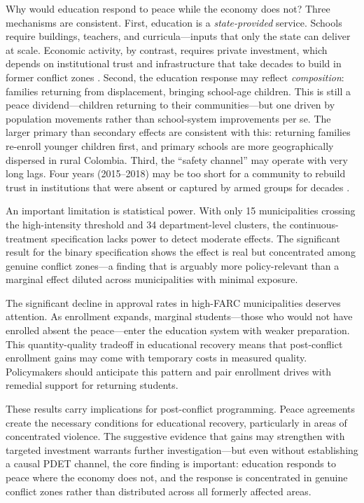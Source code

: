 \documentclass[12pt]{article}
\begin{document}
Why would education respond to peace while the economy does not? Three mechanisms are consistent. First, education is a \emph{state-provided} service. Schools require buildings, teachers, and curricula---inputs that only the state can deliver at scale. Economic activity, by contrast, requires private investment, which depends on institutional trust and infrastructure that take decades to build in former conflict zones \citep{acemoglu2013state}. Second, the education response may reflect \emph{composition}: families returning from displacement, bringing school-age children. This is still a peace dividend---children returning to their communities---but one driven by population movements rather than school-system improvements per se. The larger primary than secondary effects are consistent with this: returning families re-enroll younger children first, and primary schools are more geographically dispersed in rural Colombia. Third, the ``safety channel'' may operate with very long lags. Four years (2015--2018) may be too short for a community to rebuild trust in institutions that were absent or captured by armed groups for decades \citep{fergusson2020conflict}.

An important limitation is statistical power. With only 15 municipalities crossing the high-intensity threshold and 34 department-level clusters, the continuous-treatment specification lacks power to detect moderate effects. The significant result for the binary specification shows the effect is real but concentrated among genuine conflict zones---a finding that is arguably more policy-relevant than a marginal effect diluted across municipalities with minimal exposure.

The significant decline in approval rates in high-FARC municipalities deserves attention. As enrollment expands, marginal students---those who would not have enrolled absent the peace---enter the education system with weaker preparation. This quantity-quality tradeoff in educational recovery means that post-conflict enrollment gains may come with temporary costs in measured quality. Policymakers should anticipate this pattern and pair enrollment drives with remedial support for returning students.

These results carry implications for post-conflict programming. Peace agreements create the necessary conditions for educational recovery, particularly in areas of concentrated violence. The suggestive evidence that gains may strengthen with targeted investment warrants further investigation---but even without establishing a causal PDET channel, the core finding is important: education responds to peace where the economy does not, and the response is concentrated in genuine conflict zones rather than distributed across all formerly affected areas.
\end{document}
